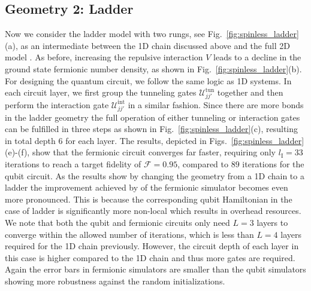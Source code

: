 \documentclass[aps, pra, reprint, superscriptaddress]{revtex4-1}
\begin{document}
\subsection{Geometry 2: Ladder }
\label{subsec:spinless_ladder}
Now we consider the ladder model with two rungs, see Fig.~\ref{fig:spinless_ladder}(a),  as an intermediate between the 1D chain discussed above and the full 2D model .
As before, increasing the repulsive interaction $V$ leads to a decline in the ground state fermionic number density, as shown in Fig.~\ref{fig:spinless_ladder}(b). For designing the quantum circuit, we follow the same logic as 1D systems. In each circuit layer, we first group the tunneling gates $\mathcal{U}^\text{tun}_{jj'}$ together and then perform the interaction gate $\mathcal{U}^\text{int}_{jj'}$  in a similar fashion. Since there are more bonds in the ladder geometry the full operation of either tunneling or interaction gates can be fulfilled in three steps as shown in Fig.~\ref{fig:spinless_ladder}(c), resulting in total depth $6$ for each layer. 
The results, depicted in Figs.~\ref{fig:spinless_ladder}(e)-(f), show that the fermionic circuit converges far faster, requiring only $l_\text{I}{=}33$ iterations to reach a target fidelity of $\mathcal{F} {=} 0.95$, compared to $89$ iterations for the qubit circuit. As the results show by changing  the geometry from a 1D chain to a ladder the improvement achieved by of the fermionic simulator becomes even more pronounced. This is because the corresponding qubit Hamiltonian in the case of ladder is significantly more non-local which results in overhead resources. 
We note that both the qubit and fermionic circuits only need $L{=}3$ layers to converge within the allowed number of iterations,  which is less than $L{=}4$ layers required for the 1D chain previously. However, the circuit depth of each layer in this case is higher compared to the 1D chain and thus more gates are required. Again the error bars in fermionic simulators are smaller than the qubit simulators showing more robustness against the random initializations. 
 
 
\end{document}
